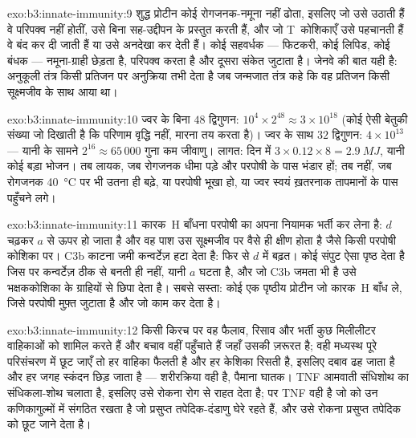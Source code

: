 \begin{solution}{exo:b3:innate-immunity:9}
शुद्ध प्रोटीन कोई रोगजनक-नमूना नहीं ढोता, इसलिए जो  उसे
उठाती हैं वे परिपक्व नहीं होतीं, उसे बिना सह-उद्दीपन के प्रस्तुत करती
हैं, और जो T~कोशिकाएँ उसे पहचानती हैं वे बंद कर दी जाती हैं या उसे
अनदेखा कर देती हैं। कोई सहवर्धक --- फिटकरी, कोई लिपिड, कोई  बंधक --- नमूना-ग्राही छेड़ता है,  परिपक्व करता है
और दूसरा संकेत जुटाता है। जेनवे की बात यही है: अनुकूली तंत्र किसी
प्रतिजन पर अनुक्रिया तभी देता है जब जन्मजात तंत्र कहे कि वह प्रतिजन
किसी सूक्ष्मजीव के साथ आया था।
\end{solution}

\begin{solution}{exo:b3:innate-immunity:10}
ज्वर के बिना $48$ द्विगुणन: $10^{4}\times 2^{48} \approx 3\times
10^{18}$ (कोई ऐसी बेतुकी संख्या जो दिखाती है कि परिणाम वृद्धि नहीं,
मारना तय करता है)। ज्वर के साथ $32$ द्विगुणन: $4\times 10^{13}$ ---
यानी  के सामने $2^{16} \approx 65\,000$ गुना कम जीवाणु।
लागत: दिन में $3\times 0.12\times 8 = \qty{2.9}{MJ}$, यानी कोई बड़ा
भोजन। तब लायक, जब रोगजनक धीमा पड़े और परपोषी के पास भंडार हों; तब नहीं,
जब रोगजनक \qty{40}{\celsius} पर भी उतना ही बढ़े, या परपोषी भूखा हो, या
ज्वर स्वयं ख़तरनाक तापमानों के पास पहुँचने लगे।
\end{solution}

\begin{solution}{exo:b3:innate-immunity:11}
कारक~H बाँधना परपोषी का अपना नियामक भर्ती कर लेना है: $d$ चढ़कर $a$ से
ऊपर हो जाता है और वह पाश उस सूक्ष्मजीव पर वैसे ही क्षीण होता है जैसे
किसी परपोषी कोशिका पर। C3b काटना जमी कन्वर्टेज़ हटा देता है: फिर से
$d$ में बढ़त। कोई संपुट ऐसा पृष्ठ देता है जिस पर कन्वर्टेज़ ठीक से बनती
ही नहीं, यानी $a$ घटता है, और जो C3b जमता भी है उसे भक्षककोशिका के
ग्राहियों से छिपा देता है। सबसे सस्ता: कोई एक पृष्ठीय प्रोटीन जो
कारक~H बाँध ले, जिसे परपोषी मुफ़्त जुटाता है और जो काम कर देता है।
\end{solution}

\begin{solution}{exo:b3:innate-immunity:12}
किसी किरच पर वह फैलाव, रिसाव और भर्ती कुछ मिलीलीटर वाहिकाओं को शामिल
करते हैं और बचाव वहीं पहुँचाते हैं जहाँ उसकी ज़रूरत है; वही मध्यस्थ पूरे
परिसंचरण में छूट जाएँ तो हर वाहिका फैलती है और हर केशिका रिसती है,
इसलिए दबाव ढह जाता है और हर जगह स्कंदन छिड़ जाता है --- शरीरक्रिया वही
है, पैमाना घातक। TNF आमवाती संधिशोथ का संधिकला-शोथ चलाता है, इसलिए उसे
रोकना रोग से राहत देता है; पर TNF वही है जो  को उन
कणिकागुल्मों में संगठित रखता है जो प्रसुप्त तपेदिक-दंडाणु घेरे रहते
हैं, और उसे रोकना प्रसुप्त तपेदिक को छूट जाने देता है।
\end{solution}

